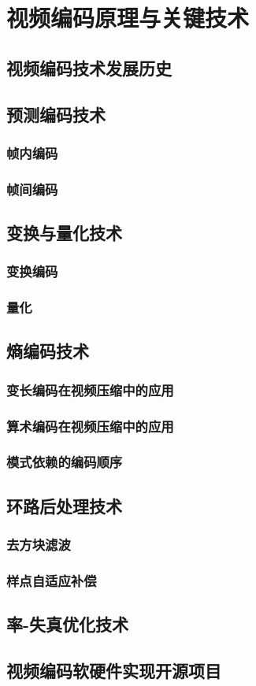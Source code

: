 \chapter{视频编码原理与关键技术}
\label{cha:c2}

\section{视频编码技术发展历史}

\section{预测编码技术}
\subsection{帧内编码}
\subsection{帧间编码}

\section{变换与量化技术}
\subsection{变换编码}
\subsection{量化}

\section{熵编码技术}
\subsection{变长编码在视频压缩中的应用}
\subsection{算术编码在视频压缩中的应用}
\subsection{模式依赖的编码顺序}

\section{环路后处理技术}
\subsection{去方块滤波}
\subsection{样点自适应补偿}

\section{率-失真优化技术}

\section{视频编码软硬件实现开源项目}